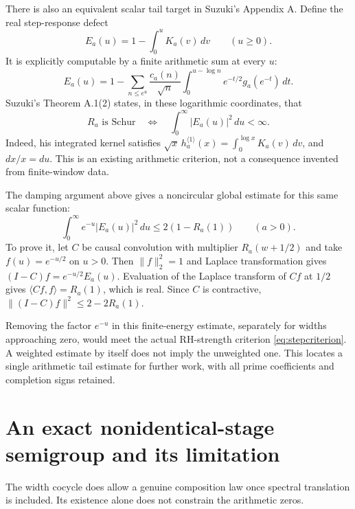 \documentclass[11pt,letterpaper]{article}
\begin{document}
There is also an equivalent scalar tail target in Suzuki's Appendix A. Define the real step-response defect
\[
 E_a(u)=1-\int_0^u K_a(v)\,dv\qquad(u\geq0).
\]
It is explicitly computable by a finite arithmetic sum at every $u$:
\[
 E_a(u)=1-\sum_{n\leq e^u}\frac{c_a(n)}{\sqrt n}
 \int_0^{u-\log n} e^{-t/2}g_a(e^{-t})\,dt.
\]
Suzuki's Theorem A.1(2) states, in these logarithmic coordinates, that
\begin{equation}\label{eq:stepcriterion}
 R_a\text{ is Schur}\quad\Longleftrightarrow\quad
 \int_0^\infty |E_a(u)|^2\,du<\infty.
\end{equation}
Indeed, his integrated kernel satisfies
$\sqrt{x}\,h_a^{\langle1\rangle}(x)=\int_0^{\log x}K_a(v)\,dv$,
and $dx/x=du$. This is an existing arithmetic criterion, not a consequence invented from finite-window data.

The damping argument above gives a noncircular global estimate for this same scalar function:
\begin{equation}\label{eq:dampedenergy}
 \int_0^\infty e^{-u}|E_a(u)|^2\,du\leq2(1-R_a(1))\qquad(a>0).
\end{equation}
To prove it, let $C$ be causal convolution with multiplier $R_a(w+1/2)$ and take $f(u)=e^{-u/2}$ on $u>0$. Then $\|f\|_2^2=1$ and Laplace transformation gives
$(I-C)f=e^{-u/2}E_a(u)$. Evaluation of the Laplace transform of $Cf$ at $1/2$ gives $\langle Cf,f\rangle=R_a(1)$, which is real. Since $C$ is contractive,
$\|(I-C)f\|^2\leq2-2R_a(1)$.

Removing the factor $e^{-u}$ in this finite-energy estimate, separately for widths approaching zero, would meet the actual RH-strength criterion \eqref{eq:stepcriterion}. A weighted estimate by itself does not imply the unweighted one. This locates a single arithmetic tail estimate for further work, with all prime coefficients and completion signs retained.

\section{An exact nonidentical-stage semigroup and its limitation}
The width cocycle does allow a genuine composition law once spectral translation is included. Its existence alone does not constrain the arithmetic zeros.
\end{document}
